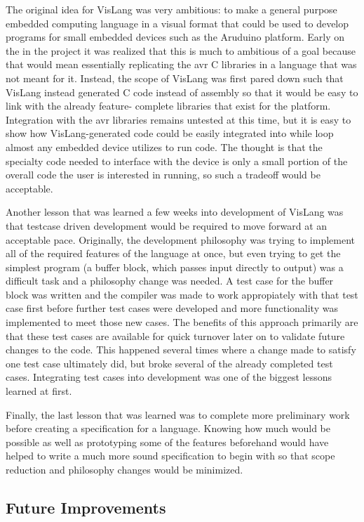 The original idea for VisLang was very ambitious: to make a general purpose embedded
computing language in a visual format that could be used to develop programs for
small embedded devices such as the Aruduino platform. Early on the in the project
it was realized that this is much to ambitious of a goal because that would mean 
essentially replicating the avr C libraries in a language that was not meant for it.
Instead, the scope of VisLang was first pared down such that VisLang instead generated
C code instead of assembly so that it would be easy to link with the already feature-
complete libraries that exist for the platform. Integration with the avr libraries
remains untested at this time, but it is easy to show how VisLang-generated code could
be easily integrated into while loop almost any embedded device utilizes to run code.
The thought is that the specialty code needed to interface with the device is only a
small portion of the overall code the user is interested in running, so such a tradeoff
would be acceptable.
\par
Another lesson that was learned a few weeks into development of VisLang was that testcase
driven development would be required to move forward at an acceptable pace. Originally,
the development philosophy was trying to implement all of the required features of the
language at once, but even trying to get the simplest program (a buffer block, which passes
input directly to output) was a difficult task and a philosophy change was needed. A test
case for the buffer block was written and the compiler was made to work appropiately with
that test case first before further test cases were developed and more functionality was
implemented to meet those new cases. The benefits of this approach primarily are that these
test cases are available for quick turnover later on to validate future changes to the code.
This happened several times where a change made to satisfy one test case ultimately did,
but broke several of the already completed test cases. Integrating test cases into
development was one of the biggest lessons learned at first.
\par
Finally, the last lesson that was learned was to complete more preliminary work before
creating a specification for a language. Knowing how much would be possible as well as
prototyping some of the features beforehand would have helped to write a much more sound
specification to begin with so that scope reduction and philosophy changes would be
minimized.

\subsection{Future Improvements}

